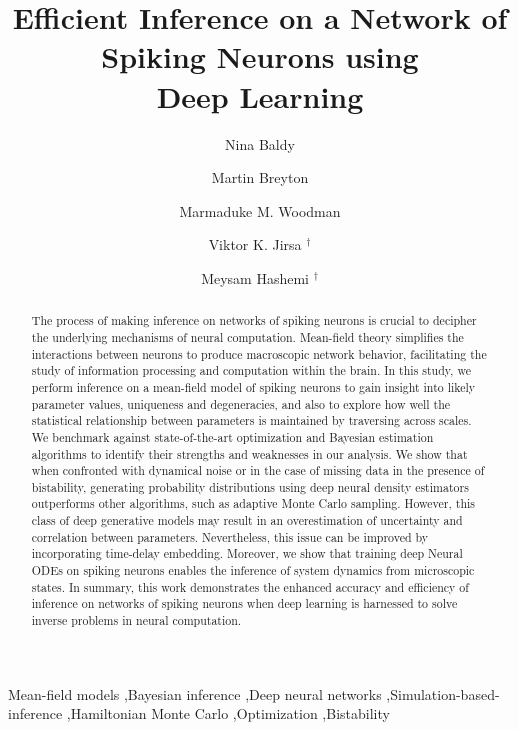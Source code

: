 \documentclass[preprint,11pt,authoryear]{elsarticle}
\begin{document}
\begin{frontmatter}


\title{Efficient Inference on a Network of Spiking Neurons using \\Deep Learning}



\rmfamily

\author[1]{Nina Baldy}
\author[2]{Martin Breyton}
\author[3]{Marmaduke M. Woodman}
\author[4]{Viktor K. Jirsa $^\dag$}
\author[5]{Meysam Hashemi $^\dag$\def\thefootnote{\dag}}


\address[1]{Aix Marseille Univ, INSERM, INS, Inst Neurosci Syst, Marseille, France}



\begin{abstract}

The process of making inference on networks of spiking neurons is crucial to decipher the underlying mechanisms of neural computation. Mean-field theory simplifies the interactions between neurons to produce macroscopic network behavior, facilitating the study of information processing and computation within the brain. In this study, we perform inference on a mean-field model of spiking neurons to gain insight into likely parameter values, uniqueness and degeneracies, and also to explore how well the statistical relationship between parameters is maintained by traversing across scales. We benchmark against state-of-the-art optimization and Bayesian estimation algorithms to identify their strengths and weaknesses in our analysis. We show that when confronted with dynamical noise or in the case of missing data in the presence of bistability, generating probability distributions using deep neural density estimators outperforms other algorithms, such as adaptive Monte Carlo sampling. However, this class of deep generative models may result in an overestimation of uncertainty and correlation between parameters. Nevertheless, this issue can be improved by incorporating time-delay embedding. Moreover, we show that training deep Neural ODEs on spiking neurons enables the inference of system dynamics from microscopic states. In summary, this work demonstrates the enhanced accuracy and efficiency of inference on networks of spiking neurons when deep learning is harnessed to solve inverse problems in neural computation.
\end{abstract}




\begin{keyword}
Mean-field models \sep Bayesian inference  \sep Deep neural networks  \sep Simulation-based-inference \sep Hamiltonian Monte Carlo  \sep Optimization  \sep Bistability
\end{keyword}

\end{frontmatter}
\end{document}

